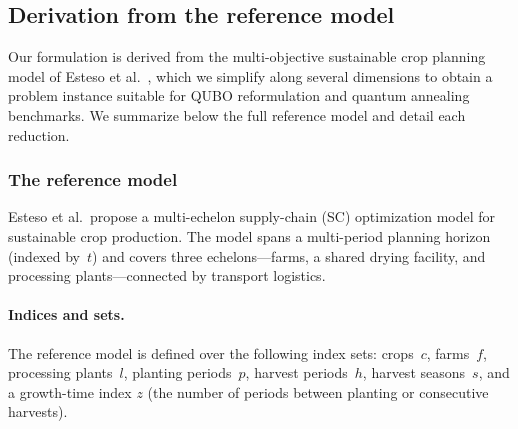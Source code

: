 
\subsection{Derivation from the reference model}
\label{sub:model_derivation}

Our formulation is derived from the multi-objective sustainable crop planning model of Esteso et al.~\cite{esteso_sustainable_2023}, which we simplify along several dimensions to obtain a problem instance suitable for QUBO reformulation and quantum annealing benchmarks. We summarize below the full reference model and detail each reduction.

\subsubsection{The reference model}

Esteso et al.\ propose a multi-echelon supply-chain (SC) optimization model for sustainable crop production.
The model spans a multi-period planning horizon (indexed by~$t$) and covers three echelons---farms, a shared drying facility, and processing plants---connected by transport logistics.

\paragraph{Indices and sets.}
The reference model is defined over the following index sets: crops~$c$, farms~$f$, processing plants~$l$, planting periods~$p$, harvest periods~$h$, harvest seasons~$s$, and a growth-time index $z$ (the number of periods between planting or consecutive harvests).

